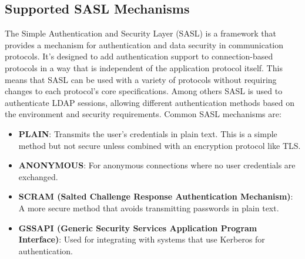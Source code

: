     


\subsection{Supported SASL Mechanisms}

The Simple Authentication and Security Layer (SASL) is a framework that provides a mechanism for authentication and data security in communication protocols. It's designed to add authentication support to connection-based protocols in a way that is independent of the application protocol itself. This means that SASL can be used with a variety of protocols without requiring changes to each protocol's core specifications. Among others SASL is used to authenticate LDAP sessions, allowing different authentication methods based on the environment and security requirements. Common SASL mechanisms are:

\begin{itemize}
    \item \textbf{PLAIN}: Transmits the user's credentials in plain text. This is a simple method but not secure unless combined with an encryption protocol like TLS.
    \item \textbf{ANONYMOUS}: For anonymous connections where no user credentials are exchanged.
    \item \textbf{SCRAM (Salted Challenge Response Authentication Mechanism)}: A more secure method that avoids transmitting passwords in plain text.
    \item \textbf{GSSAPI (Generic Security Services Application Program Interface)}: Used for integrating with systems that use Kerberos for authentication.
\end{itemize}

